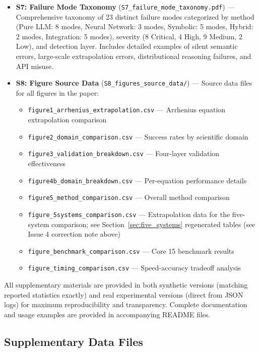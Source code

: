 \documentclass[twoside,11pt]{article}
\begin{document}
\begin{itemize}
\item \textbf{S7: Failure Mode Taxonomy} (\texttt{S7\_failure\_mode\_taxonomy.pdf}) --- Comprehensive taxonomy of 23 distinct failure modes categorized by method (Pure LLM: 8 modes, Neural Network: 3 modes, Symbolic: 5 modes, Hybrid: 2 modes, Integration: 5 modes), severity (8 Critical, 4 High, 9 Medium, 2 Low), and detection layer. Includes detailed examples of silent semantic errors, large-scale extrapolation errors, distributional reasoning failures, and API misuse.

\item \textbf{S8: Figure Source Data} (\texttt{S8\_figures\_source\_data/}) --- Source data files for all figures in the paper:
\begin{itemize}
\item \texttt{figure1\_arrhenius\_extrapolation.csv} --- Arrhenius equation extrapolation comparison
\item \texttt{figure2\_domain\_comparison.csv} --- Success rates by scientific domain
\item \texttt{figure3\_validation\_breakdown.csv} --- Four-layer validation effectiveness
\item \texttt{figure4b\_domain\_breakdown.csv} --- Per-equation performance details
\item \texttt{figure5\_method\_comparison.csv} --- Overall method comparison
\item \texttt{figure\_5systems\_comparison.csv} --- Extrapolation data for the five-system comparison; see Section~\ref{sec:five_systems} regenerated tables (see Issue 4 correction note above)
\item \texttt{figure\_benchmark\_comparison.csv} --- Core 15 benchmark results
\item \texttt{figure\_timing\_comparison.csv} --- Speed-accuracy tradeoff analysis
\end{itemize}
\end{itemize}

All supplementary materials are provided in both synthetic versions (matching reported statistics exactly) and real experimental versions (direct from JSON logs) for maximum reproducibility and transparency. Complete documentation and usage examples are provided in accompanying README files.

\subsection{Supplementary Data Files}
\end{document}

